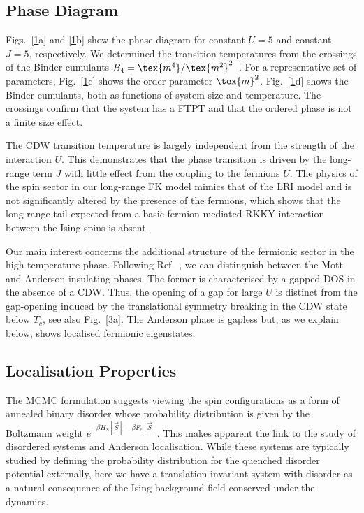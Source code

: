 \hypertarget{lrfk-results-phase-diagram}{%
\subsection{Phase Diagram}\label{lrfk-results-phase-diagram}}

Figs.~{[}\protect\hyperlink{fig:phase_diagram}{1}a{]} and {[}\protect\hyperlink{fig:phase_diagram}{1}b{]} show the phase diagram for constant \(U=5\) and constant \(J=5\), respectively. We determined the transition temperatures from the crossings of the Binder cumulants \(B_4 = \tex{m^4}/\tex{m^2}^2\)~\autocite{binderFiniteSizeScaling1981}. For a representative set of parameters, Fig.~{[}\protect\hyperlink{fig:phase_diagram}{1}c{]} shows the order parameter \(\tex{m}^2\). Fig.~{[}\protect\hyperlink{fig:phase_diagram}{1}d{]} shows the Binder cumulants, both as functions of system size and temperature. The crossings confirm that the system has a FTPT and that the ordered phase is not a finite size effect.

The CDW transition temperature is largely independent from the strength of the interaction \(U\). This demonstrates that the phase transition is driven by the long-range term \(J\) with little effect from the coupling to the fermions \(U\). The physics of the spin sector in our long-range FK model mimics that of the LRI model and is not significantly altered by the presence of the fermions, which shows that the long range tail expected from a basic fermion mediated RKKY interaction between the Ising spins is absent.

Our main interest concerns the additional structure of the fermionic sector in the high temperature phase. Following Ref.~\autocite{antipovInteractionTunedAndersonMott2016}, we can distinguish between the Mott and Anderson insulating phases. The former is characterised by a gapped DOS in the absence of a CDW. Thus, the opening of a gap for large \(U\) is distinct from the gap-opening induced by the translational symmetry breaking in the CDW state below \(T_c\), see also Fig.~{[}\protect\hyperlink{fig:band_opening}{3}a{]}. The Anderson phase is gapless but, as we explain below, shows localised fermionic eigenstates.

\hypertarget{localisation-properties}{%
\subsection{Localisation Properties}\label{localisation-properties}}

The MCMC formulation suggests viewing the spin configurations as a form of annealed binary disorder whose probability distribution is given by the Boltzmann weight \(e^{-\beta H_S[\vec{S}] - \beta F_c[\vec{S}]}\). This makes apparent the link to the study of disordered systems and Anderson localisation. While these systems are typically studied by defining the probability distribution for the quenched disorder potential externally, here we have a translation invariant system with disorder as a natural consequence of the Ising background field conserved under the dynamics.

